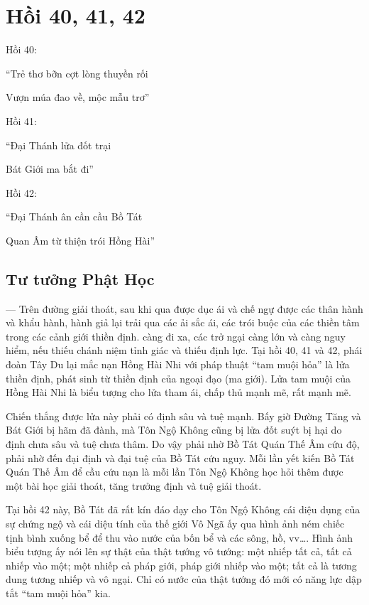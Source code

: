 \chapter{Hồi 40, 41, 42} %
\label{cha:hoi_40_41}

Hồi 40:

\begin{itshape}
``Trẻ thơ bỡn cợt lòng thuyền rối

Vượn múa đao về, mộc mẫu trơ''
\end{itshape}

Hồi 41:

\begin{itshape}
``Đại Thánh lửa đốt trại

Bát Giới ma bắt đi''
\end{itshape}

Hồi 42:

\begin{itshape}
``Đại Thánh ân cần cầu Bồ Tát

Quan Âm từ thiện trói Hồng Hài''
\end{itshape}

\section{Tư tưởng Phật Học} %
\label{sec:40_41_phat_hoc}

— Trên đường giải thoát, sau khi qua được dục ái và chế ngự được các thân hành và khẩu hành, hành giả lại trải qua các ải sắc ái, các trói buộc của các thiền tâm trong các cảnh giới thiền định. càng đi xa, các trở ngại càng lớn và càng nguy hiểm, nếu thiếu chánh niệm tỉnh giác và thiếu định lực. Tại hồi 40, 41 và 42, phái đoàn Tây Du lại mắc nạn Hồng Hài Nhi với pháp thuật ``tam muội hỏa'' là lửa thiền định, phát sinh từ thiền định của ngoại đạo (ma giới). Lửa tam muội của Hồng Hài Nhi là biểu tượng cho lửa tham ái, chấp thủ mạnh mẽ, rất mạnh mẽ.

Chiến thắng được lửa này phải có định sâu và tuệ mạnh. Bấy giờ Đường Tăng và Bát Giới bị hãm đã đành, mà Tôn Ngộ Không cũng bị lửa đốt suýt bị hại do định chưa sâu và tuệ chưa thâm. Do vậy phải nhờ Bồ Tát Quán Thế Âm cứu độ, phải nhờ đến đại định và đại tuệ của Bồ Tát cứu nguy. Mỗi lần yết kiến Bồ Tát Quán Thế Âm để cầu cứu nạn là mỗi lần Tôn Ngộ Không học hỏi thêm được một bài học giải thoát, tăng trưởng định và tuệ giải thoát.

Tại hồi 42 này, Bồ Tát đã rất kín đáo dạy cho Tôn Ngộ Không cái diệu dụng của sự chứng ngộ và cái diệu tính của thế giới Vô Ngã ấy qua hình ảnh ném chiếc tịnh bình xuống bể để thu vào nước của bốn bể và các sông, hồ, vv\ldots. Hình ảnh biểu tượng ấy nói lên sự thật của thật tướng vô tướng: một nhiếp tất cả, tất cả nhiếp vào một; một nhiếp cả pháp giới, pháp giới nhiếp vào một; tất cả là tương dung tương nhiếp và vô ngại. Chỉ có nước của thật tướng đó mới có năng lực dập tắt ``tam muội hỏa'' kia.

